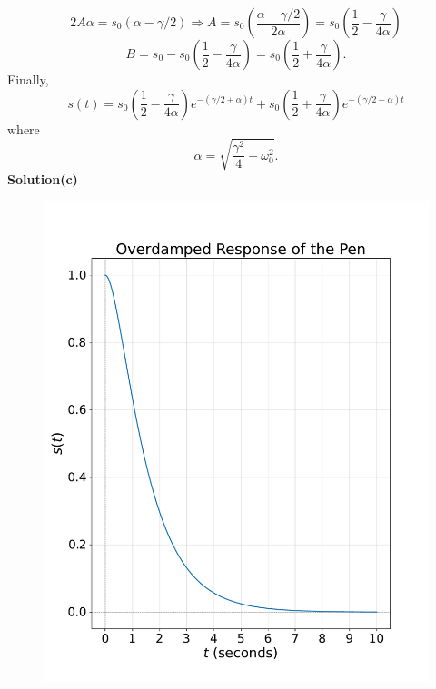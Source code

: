 \documentclass[12pt,a4paper]{article}
\begin{document}
\[2A\alpha=s_0\left(\alpha-\gamma/2\right)\Rightarrow A=s_0\left(\frac{\alpha-\gamma/2}{2\alpha}\right)=s_0\left(\frac{1}{2}-\frac{\gamma}{4\alpha}\right)\]
\[B=s_0-s_0\left(\frac{1}{2}-\frac{\gamma}{4\alpha}\right)=s_0\left(\frac{1}{2}+\frac{\gamma}{4\alpha}\right).\]
Finally,
\[s(t)=s_0\left(\frac{1}{2}-\frac{\gamma}{4\alpha}\right)e^{-\left(\gamma/2+\alpha\right)t}+s_0\left(\frac{1}{2}+\frac{\gamma}{4\alpha}\right)e^{-\left(\gamma/2-\alpha\right)t}\]
where
\[\alpha=\sqrt{\frac{\gamma^2}{4}-\omega_0^2}.\]
\textbf{Solution(c)}
\begin{figure}[h!]
    \centering
    \includegraphics[width=0.8\linewidth]{figs/fig_sol_1.7c.pdf}
\end{figure}
\end{document}

